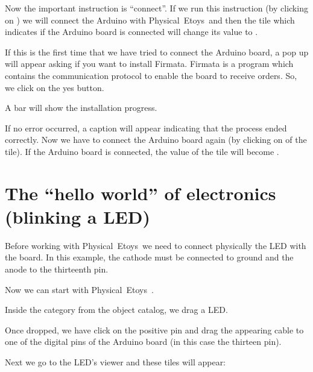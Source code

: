 \documentclass[english]{etoys-guide}
\def\appName{Physical~Etoys~}
\begin{document}


Now the important instruction is “connect”. If we run this instruction (by
clicking on ) we will connect the Arduino with
\appName and then the tile which indicates if the Arduino board is
connected will change its value to . 


If this is the first time that we have tried to connect the Arduino board, a
pop up will appear asking if you want to install Firmata. Firmata is a program
which contains the communication protocol to enable the board to receive
orders. So, we click on the yes button. 



A bar will show the installation progress.
 

If no error occurred, a caption will appear indicating that the process ended
correctly. Now we have to connect the Arduino board again (by clicking on
 of the  tile). If the Arduino
board is connected, the value of the  tile will become
. 


\section{The ``hello world'' of electronics (blinking a LED)}

Before working with \appName we need to connect physically the LED with
the board. In this example, the cathode must be connected to ground and the
anode to the thirteenth pin. 



Now we can start with \appName. 

Inside the  category from the object catalog, we drag a LED. 


Once dropped, we have click on the positive pin and drag the appearing cable to
one of the digital pins of the Arduino board (in this case the thirteen pin). 


Next we go to the LED's viewer and these tiles will appear:
\end{document}
